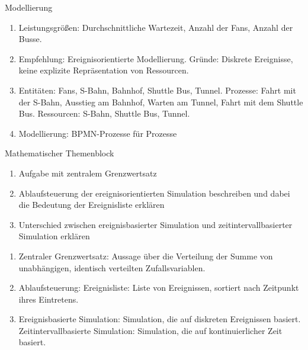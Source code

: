 \documentclass{article}
\begin{document}
\begin{exercise}{Modellierung}
  \begin{solution}
    \begin{enumerate}
      \item Leistungsgrößen: Durchschnittliche Wartezeit, Anzahl der Fans, Anzahl der Busse.
      \item Empfehlung: Ereignisorientierte Modellierung. Gründe: Diskrete Ereignisse, keine explizite Repräsentation von Ressourcen.
      \item Entitäten: Fans, S-Bahn, Bahnhof, Shuttle Bus, Tunnel. Prozesse: Fahrt mit der S-Bahn, Ausstieg am Bahnhof, Warten am Tunnel, Fahrt mit dem Shuttle Bus. Ressourcen: S-Bahn, Shuttle Bus, Tunnel.
      \item Modellierung: BPMN-Prozesse für Prozesse
    \end{enumerate}
  \end{solution}
\end{exercise}

\begin{exercise}{Mathematischer Themenblock}
  \begin{enumerate}
    \item Aufgabe mit zentralem Grenzwertsatz
    \item Ablaufsteuerung der ereignisorientierten Simulation beschreiben und dabei die Bedeutung der Ereignisliste erklären
    \item Unterschied zwischen ereignisbasierter Simulation und zeitintervallbasierter Simulation erklären
  \end{enumerate}

  \begin{solution}
    \begin{enumerate}
      \item Zentraler Grenzwertsatz: Aussage über die Verteilung der Summe von unabhängigen, identisch verteilten Zufallsvariablen.
      \item Ablaufsteuerung: Ereignisliste: Liste von Ereignissen, sortiert nach Zeitpunkt ihres Eintretens.
      \item Ereignisbasierte Simulation: Simulation, die auf diskreten Ereignissen basiert. Zeitintervallbasierte Simulation: Simulation, die auf kontinuierlicher Zeit basiert.
    \end{enumerate}
  \end{solution}
\end{exercise}
\end{document}
